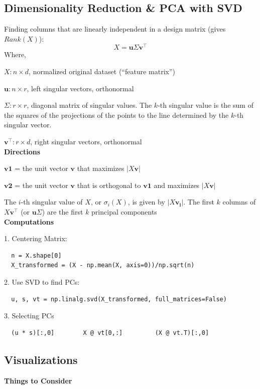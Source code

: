\documentclass[8pt]{extarticle}
\begin{document}
\subsection*{Dimensionality Reduction \& PCA with SVD}
Finding columns that are linearly independent in a design matrix (gives $Rank(X)$):
$$ X = \mathbf{u}\Sigma \mathbf{v^\top} $$
Where,

$X: n\times d$, normalized original dataset (“feature matrix”)\par
$\mathbf{u}: n\times r$, left singular vectors, orthonormal\par
$\Sigma: r\times r$, diagonal matrix of singular values. The $k$-th singular value is the sum of the squares of the projections of the points to the line determined by the $k$-th singular vector.\par
$\mathbf{v^\top}: r\times d$, right singular vectors, orthonormal\\

\textbf{Directions}

$\mathbf{v1}$ = the unit vector $\mathbf{v}$ that maximizes $|X\mathbf{v}|$\par
$\mathbf{v2}$ = the unit vector $\mathbf{v}$ that is orthogonal to $\mathbf{v1}$ and maximizes $|X\mathbf{v}|$\par
The $i$-th singular value of $X$, or $\sigma_i(X)$, is given by $|X\mathbf{v_i}|$. The first $k$ columns of $X\mathbf{v^\top}$ (or $\mathbf{u}\Sigma$) are the first $k$ principal components\\

\textbf{Computations}

1. Centering Matrix:
\begin{verbatim}
  n = X.shape[0]
  X_transformed = (X - np.mean(X, axis=0))/np.sqrt(n)
\end{verbatim}

2. Use SVD to find PCs:
\begin{verbatim}
  u, s, vt = np.linalg.svd(X_transformed, full_matrices=False)
\end{verbatim}

3. Selecting PCs
\begin{verbatim}
  (u * s)[:,0]        X @ vt[0,:]         (X @ vt.T)[:,0]
\end{verbatim}
\hline

\subsection*{Visualizations}
\textbf{Things to Consider}
\end{document}
